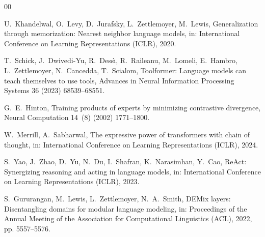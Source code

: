 \documentclass[preprint,12pt]{elsarticle}
\begin{document}
\begin{thebibliography}{00}

U.~Khandelwal, O.~Levy, D.~Jurafsky, L.~Zettlemoyer, M.~Lewis,
Generalization through memorization: Nearest neighbor language models,
in: International Conference on Learning Representations (ICLR), 2020.

T.~Schick, J.~Dwivedi-Yu, R.~Dess{\`\i}, R.~Raileanu, M.~Lomeli, E.~Hambro, L.~Zettlemoyer, N.~Cancedda, T.~Scialom,
Toolformer: Language models can teach themselves to use tools,
Advances in Neural Information Processing Systems 36 (2023) 68539--68551.

G.~E.~Hinton,
Training products of experts by minimizing contrastive divergence,
Neural Computation 14~(8) (2002) 1771--1800.

W.~Merrill, A.~Sabharwal,
The expressive power of transformers with chain of thought,
in: International Conference on Learning Representations (ICLR), 2024.

S.~Yao, J.~Zhao, D.~Yu, N.~Du, I.~Shafran, K.~Narasimhan, Y.~Cao,
ReAct: Synergizing reasoning and acting in language models,
in: International Conference on Learning Representations (ICLR), 2023.

S.~Gururangan, M.~Lewis, L.~Zettlemoyer, N.~A.~Smith,
DEMix layers: Disentangling domains for modular language modeling,
in: Proceedings of the Annual Meeting of the Association for Computational Linguistics (ACL), 2022, pp. 5557--5576.

\end{thebibliography}
\end{document}
